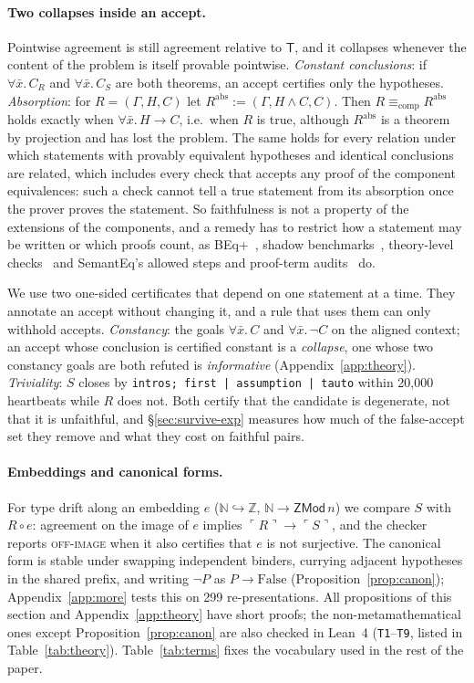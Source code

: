 \documentclass[10pt]{article}
\theoremstyle{definition}
\newcommand{\T}{\mathsf{T}}
\newcommand{\Cl}[1]{\ulcorner #1 \urcorner}
\newcommand{\Ecomp}{\mathrel{\equiv_{\mathrm{comp}}}}
\newcommand{\V}[1]{\textsc{#1}}
\begin{document}
\paragraph{Two collapses inside an accept.} Pointwise agreement is still agreement relative
to $\T$, and it collapses whenever the content of the problem is itself provable pointwise.
\emph{Constant conclusions}: if $\forall\bar x.\,C_R$ and $\forall\bar x.\,C_S$ are both theorems, an
accept certifies only the hypotheses. \emph{Absorption}: for $R=(\Gamma,H,C)$ let
$R^{\mathrm{abs}}:=(\Gamma,H\wedge C,C)$. Then $R\Ecomp R^{\mathrm{abs}}$ holds exactly when
$\forall\bar x.\,H\to C$, i.e.\ when $R$ is true, although $R^{\mathrm{abs}}$ is a theorem by
projection and has lost the problem. The same holds for every relation under which statements with
provably equivalent hypotheses and identical conclusions are related, which includes every check
that accepts any proof of the component equivalences: such a check cannot tell a true statement
from its absorption once the prover proves the statement. So faithfulness is not a property of
the extensions of the components, and a remedy has to restrict how a statement may be written or
which proofs count, as BEq+~\cite{beq}, shadow benchmarks~\cite{shadowbench}, theory-level
checks~\cite{tla} and SemantEq's allowed steps and proof-term audits~\cite{semanteq} do.

We use two one-sided certificates that depend on one statement at a time. They annotate an
accept without changing it, and a rule that uses them can only withhold accepts. \emph{Constancy}: the goals $\forall\bar x.\,C$ and $\forall\bar x.\,\neg C$ on the aligned
context; an accept whose conclusion is certified constant is a \emph{collapse}, one whose two
constancy goals are both refuted is \emph{informative} (Appendix~\ref{app:theory}).
\emph{Triviality}: $S$ closes by \texttt{intros; first | assumption | tauto} within 20{,}000
heartbeats while $R$ does not. Both certify that the candidate is degenerate, not that it is
unfaithful, and \S\ref{sec:survive-exp} measures how much of the false-accept set they remove and
what they cost on faithful pairs.

\paragraph{Embeddings and canonical forms.} For type drift along an embedding $e$
($\mathbb N\hookrightarrow\mathbb Z$, $\mathbb N\to\mathsf{ZMod}\,n$) we compare $S$ with $R\circ e$:
agreement on the image of $e$ implies $\Cl R\to\Cl S$, and the checker reports \V{off-image} when it
also certifies that $e$ is not surjective. The canonical form is stable under swapping independent
binders, currying adjacent hypotheses in the shared prefix, and writing $\neg P$ as
$P\to\mathrm{False}$ (Proposition~\ref{prop:canon}); Appendix~\ref{app:more} tests this on 299
re-presentations. All propositions of this section and Appendix~\ref{app:theory} have short
proofs; the non-metamathematical ones except Proposition~\ref{prop:canon} are also checked in
Lean~4 (\texttt{T1}--\texttt{T9}, listed in Table~\ref{tab:theory}).
Table~\ref{tab:terms} fixes the vocabulary used in the rest of the paper.
\end{document}
